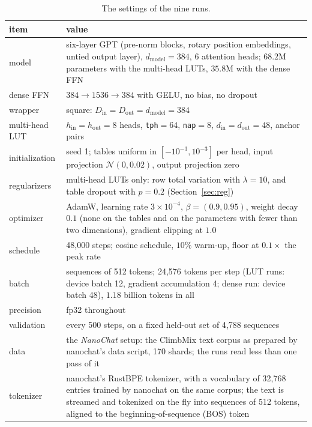 \documentclass[11pt]{article}
\renewcommand{\arraystretch}{1.45}
\DeclareRobustCommand{\code}[1]{{\renewcommand{\_}{\textunderscore\allowbreak}\texttt{#1}}}
\begin{document}
\begin{table}[htb]
\centering\small
\renewcommand{\arraystretch}{1.3}
\setlength{\tabcolsep}{8pt}
\begin{tabular}{L{30mm}L{118mm}}
\toprule
item & value \\
\midrule
model & six-layer GPT (pre-norm blocks, rotary position embeddings, untied output layer), $d_\text{model}=384$, 6 attention heads; $68.2$M parameters with the multi-head LUTs, $35.8$M with the dense FFN \\
dense FFN & $384\!\to\!1536\!\to\!384$ with GELU, no bias, no dropout \\
wrapper & square: $D_\text{in}=D_\text{out}=d_\text{model}=384$ \\
multi-head LUT & $h_\text{in}=h_\text{out}=8$ heads, \code{tph}$=64$, \code{nap}$=8$, $d_\text{in}=d_\text{out}=48$, anchor pairs \\
initialization & seed 1; tables uniform in $[-10^{-3},10^{-3}]$ per head, input projection $\mathcal{N}(0,0.02)$, output projection zero \\
regularizers & multi-head LUTs only: row total variation with $\lambda=10$, and table dropout with $p=0.2$ (Section~\ref{sec:reg}) \\
optimizer & AdamW, learning rate $3\times10^{-4}$, $\beta=(0.9,0.95)$, weight decay $0.1$ (none on the tables and on the parameters with fewer than two dimensions), gradient clipping at $1.0$ \\
schedule & 48{,}000 steps; cosine schedule, $10\%$ warm-up, floor at $0.1\times$ the peak rate \\
batch & sequences of 512 tokens; 24{,}576 tokens per step (LUT runs: device batch 12, gradient accumulation 4; dense run: device batch 48), $1.18$ billion tokens in all \\
precision & fp32 throughout \\
validation & every 500 steps, on a fixed held-out set of 4{,}788 sequences \\
data & the \emph{NanoChat} setup: the ClimbMix text corpus as prepared by nanochat's data script, 170 shards; the runs read less than one pass of it \\
tokenizer & nanochat's RustBPE tokenizer, with a vocabulary of 32{,}768 entries trained by nanochat on the same corpus; the text is streamed and tokenized on the fly into sequences of 512 tokens, aligned to the beginning-of-sequence (BOS) token \\
\bottomrule
\end{tabular}
\caption{The settings of the nine runs.}
\label{tab:setup}
\end{table}
\end{document}
